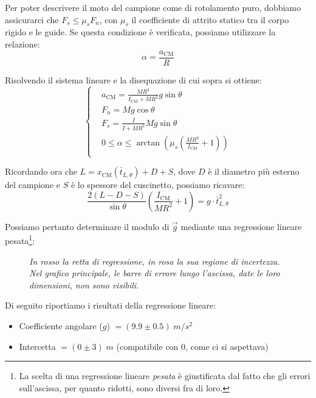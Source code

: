 \documentclass{article}
\begin{document}
Per poter descrivere il moto del campione come di rotolamento puro,
dobbiamo assicurarci che $F_s \le \mu_s F_n$, con $\mu_s$ il
coefficiente di attrito statico tra il corpo rigido e le guide.
Se questa condizione è verificata, possiamo utilizzare la relazione:
\[\alpha = \frac{a_\text{CM}}{R}\]

Risolvendo il sistema lineare e la disequazione di cui sopra si ottiene:
\[\left\{\begin{aligned}
    &a_\text{CM} = \frac{M R^2}{I_\text{CM} + M R^2} g\sin\theta \\
    &F_n = M g \cos\theta \\
    &F_s = \frac{I}{I + M R^2} M g \sin\theta \\
    & 0 \le \alpha \le \arctan\left(\mu_s \left(\frac{MR^2}{I_\text{CM}} + 1\right)\right) \\
\end{aligned}\right.\]

Ricordando ora che $L = x_\text{CM}(\bar{t}_{L,\theta}) + D + S$, dove $D$ è il diametro
più esterno del campione e $S$ è lo spessore del cuscinetto, possiamo ricavare:
\[
    \frac{2(L-D-S)}{\sin\theta}\left(\frac{I_\text{CM}}{M R^2} + 1\right) = g \cdot \bar{t}_{L,\theta}^2
\]

Possiamo pertanto determinare il modulo di $\vec{g}$ mediante una regressione
lineare pesata\footnote{
    La scelta di una regressione lineare \emph{pesata} è giustificata dal fatto
    che gli errori sull'ascissa, per quanto ridotti, sono diversi fra di loro.
}:
\begin{figure}[H]
    \caption*{\emph{
        In rosso la retta di regressione, in rosa la sua regione di incertezza. \\
        Nel grafico principale, le barre di errore lungo l'ascissa, date le loro
        dimensioni, non sono visibili.
    }}
\end{figure}

Di seguito riportiamo i risultati della regressione lineare:
\begin{itemize}
    \item Coefficiente angolare ($g$) $=(9.9\pm0.5)\;\unit{m \per s^2}$
    \item Intercetta $=(0\pm3)\;\unit{m}$ (compatibile con $0$, come ci si aspettava)
\end{itemize}
\end{document}
